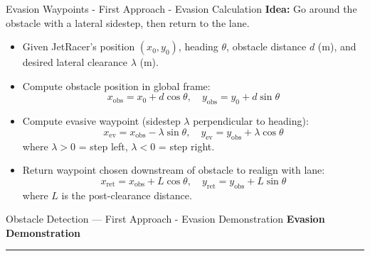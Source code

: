 \documentclass[aspectratio=169,12pt]{beamer}
\begin{document}
\begin{frame}[t]{Evasion Waypoints - First Approach - Evasion Calculation}
  \vspace*{-0.3em}
  \textbf{Idea:} Go around the obstacle with a lateral sidestep, then return to the lane.
  \vspace{0.4em}

  \begin{itemize}\setlength{\itemsep}{0.35em}
    \item Given JetRacer's position \((x_0, y_0)\), heading \(\theta\), obstacle distance \(d\) (m), and desired lateral clearance \(\lambda\) (m).
    \item Compute obstacle position in global frame:
      \[
        x_{\text{obs}} = x_0 + d\cos\theta,
        \quad
        y_{\text{obs}} = y_0 + d\sin\theta
      \]
    \item Compute evasive waypoint (sidestep \(\lambda\) perpendicular to heading):
      \[
        x_{\text{ev}} = x_{\text{obs}} - \lambda\sin\theta,
        \quad
        y_{\text{ev}} = y_{\text{obs}} + \lambda\cos\theta
      \]
      where \(\lambda > 0\) = step left, \(\lambda < 0\) = step right.
    \item Return waypoint chosen downstream of obstacle to realign with lane:
      \[
        x_{\text{ret}} = x_{\text{obs}} + L\cos\theta,
        \quad
        y_{\text{ret}} = y_{\text{obs}} + L\sin{\theta}
      \]
      where \(L\) is the post-clearance distance.

  \end{itemize}
\end{frame}

\begin{frame}[t]{Obstacle Detection — First Approach - Evasion Demonstration}
  \vspace*{-0.3em}
  \textbf{Evasion Demonstration}
  
  \centering
  \rule{0pt}{6cm}\rule{0.85\linewidth}{0pt} %
  
\end{frame}
\end{document}
